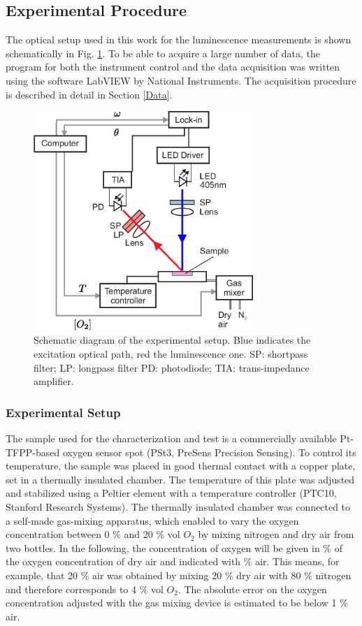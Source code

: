 \documentclass[final,5p,times,twocolumn]{elsarticle}
\begin{document}
\subsection{Experimental Procedure}
\label{Experimental}

The optical setup used in this work for the luminescence measurements is shown schematically in Fig. \ref{fig:setup}. To be able to acquire a large number of data, the program for both the instrument control and the data acquisition was written using the software LabVIEW by National Instruments. The acquisition procedure is described in detail in Section \ref{Data}.

\begin{figure}[t!]
\centering
\includegraphics[keepaspectratio, width=8.3cm]{Setup_auto.eps}
\caption{Schematic diagram of the experimental setup. Blue indicates the excitation optical path, red the luminescence one. SP: shortpass filter; LP: longpass filter PD: photodiode; TIA: trans-impedance amplifier.}
\label{fig:setup}
\end{figure}


\subsubsection{Experimental Setup}

The sample used for the characterization and test is a commercially available Pt-TFPP-based oxygen sensor spot (PSt3, PreSens Precision Sensing).
To control its temperature, the sample was placed in good thermal contact with a copper plate, set in a thermally insulated chamber. The temperature of this plate was adjusted and stabilized using a Peltier element with a temperature controller (PTC10, Stanford Research Systems). The thermally insulated chamber was connected to a self-made gas-mixing apparatus, which enabled to vary the oxygen concentration between 0 $\%$ and 20 $\%$ vol $O_2$ by mixing nitrogen and dry air from two bottles. In the following, the concentration of oxygen will be given in $\%$ of the oxygen concentration of dry air and indicated with $\%$ air. This means, for example, that 20 $\%$ air was obtained by mixing 20 $\%$ dry air with 80 $\%$ nitrogen and therefore corresponds to 4 $\%$ vol $O_2$. The absolute error on the oxygen concentration adjusted with the gas mixing device is estimated to be below 1 $\%$ air. 
 
\end{document}
